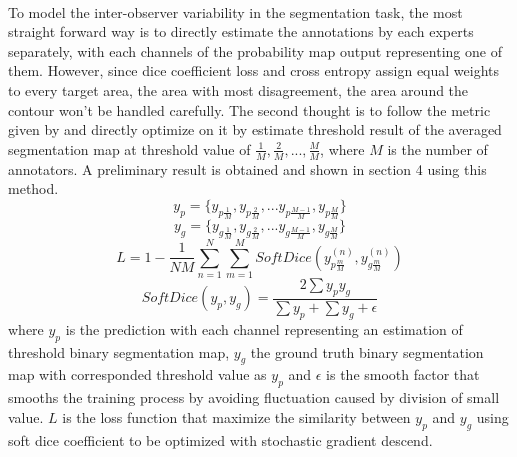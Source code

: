 \documentclass[12pt]{extarticle}
\begin{document}
\paragraph{}
To model the inter-observer variability in the segmentation task, 
the most straight forward way is to directly estimate the annotations
 by each experts separately, with each channels of the probability 
 map output representing one of them. However, since dice coefficient loss and cross entropy 
assign equal weights to every target area, the area with most disagreement, 
the area around the contour won't be handled carefully\cite{Kervadec_2021}.
The second thought is to follow the metric given by \cite{qubiq} and directly 
optimize on it by estimate threshold result of the averaged segmentation map 
at threshold value of $\frac{1}{M}, \frac{2}{M}, ..., \frac{M}{M}$, 
where $M$ is the number of annotators. A preliminary result is obtained and 
shown in section 4 using this method.
\begin{equation}
    y_{p} = \{y_{p\frac{1}{M}}, y_{p\frac{2}{M}}, ... y_{p\frac{M-1}{M}},y_{p\frac{M}{M}}\}
\end{equation}
\begin{equation}
    y_{g} = \{y_{g\frac{1}{M}}, y_{g\frac{2}{M}}, ... y_{g\frac{M-1}{M}},y_{g\frac{M}{M}}\}
\end{equation}
\begin{equation}
    L = 1 - \frac{1}{NM}\sum_{n=1}^{N}\sum_{m=1}^{M}SoftDice(y_{p\frac{m}{M}}^{(n)}, y_{g\frac{m}{M}}^{(n)})
\end{equation}
\begin{equation}
    SoftDice(y_p, y_g) = \frac{2\sum y_p y_g}{\sum y_p +  \sum y_g + \epsilon}
\end{equation}
where $y_p$ is the prediction with each
channel representing an estimation of threshold binary segmentation map, 
$y_g$ the ground truth binary segmentation map with corresponded threshold 
value as $y_p$ and $\epsilon$ is the smooth factor that smooths 
the training process by avoiding fluctuation caused by division of small value.
$L$ is the loss function that maximize the similarity 
between $y_p$ and $y_g$ using soft dice coefficient 
to be optimized with stochastic gradient descend. 
\end{document}
